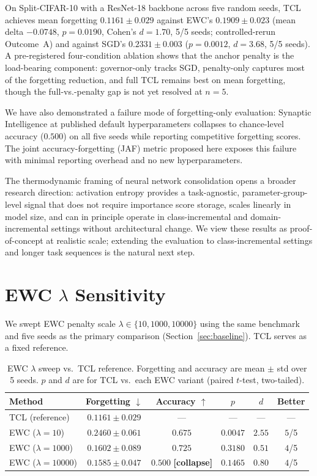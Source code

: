 \documentclass[10pt,a4paper]{article}
\begin{document}
On Split-CIFAR-10 with a ResNet-18 backbone across five random seeds, TCL achieves
mean forgetting $0.1161 \pm 0.029$ against EWC's $0.1909 \pm 0.023$
(mean delta $-0.0748$, $p = 0.0190$, Cohen's $d = 1.70$, 5/5 seeds; controlled-rerun
Outcome~A) and against SGD's $0.2331 \pm 0.003$
($p = 0.0012$, $d = 3.68$, 5/5 seeds).
A pre-registered four-condition ablation shows that the anchor penalty is the
load-bearing component: governor-only tracks SGD, penalty-only captures most of the
forgetting reduction, and full TCL remains best on mean forgetting, though the
full-vs.-penalty gap is not yet resolved at $n=5$.

We have also demonstrated a failure mode of forgetting-only evaluation: Synaptic
Intelligence at published default hyperparameters collapses to chance-level accuracy
($0.500$) on all five seeds while reporting competitive forgetting scores.
The joint accuracy-forgetting (JAF) metric proposed here exposes this failure with
minimal reporting overhead and no new hyperparameters.

The thermodynamic framing of neural network consolidation opens a broader research
direction: activation entropy provides a task-agnostic, parameter-group-level signal
that does not require importance score storage, scales linearly in model size, and
can in principle operate in class-incremental and domain-incremental settings without
architectural change.
We view these results as proof-of-concept at realistic scale;
extending the evaluation to class-incremental settings and longer task sequences is
the natural next step.





\appendix
\section{EWC $\lambda$ Sensitivity}
\label{app:ewc-sweep}

We swept EWC penalty scale $\lambda \in \{10, 1000, 10000\}$ using
the same benchmark and five seeds as the primary comparison (Section~\ref{sec:baseline}).
TCL serves as a fixed reference.

\begin{table}[h]
\centering
\caption{EWC $\lambda$ sweep vs.\ TCL reference. Forgetting and accuracy are
mean $\pm$ std over 5 seeds. $p$ and $d$ are for TCL vs.\ each EWC variant
(paired $t$-test, two-tailed).}
\label{tab:ewc-sweep}
\begin{tabular}{lccccc}
\toprule
Method & Forgetting $\downarrow$ & Accuracy $\uparrow$ & $p$ & $d$ & Better \\
\midrule
TCL (reference) & $0.1161 \pm 0.029$ & --- & --- & --- & --- \\
EWC ($\lambda=10$) & $0.2460 \pm 0.061$ & $0.675$ & $0.0047$ & $2.55$ & $5$/5 \\
EWC ($\lambda=1000$) & $0.1602 \pm 0.089$ & $0.725$ & $0.3180$ & $0.51$ & $4$/5 \\
EWC ($\lambda=10000$) & $0.1585 \pm 0.047$ & $0.500$ \textbf{[collapse]} & $0.1465$ & $0.80$ & $4$/5 \\
\bottomrule
\end{tabular}
\end{table}
\end{document}
